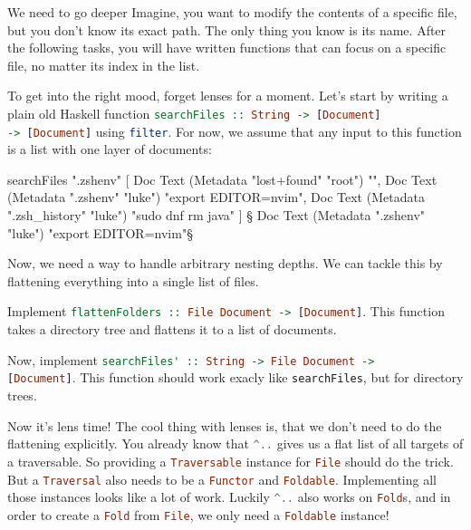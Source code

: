 \documentclass{exercise}
\makeatletter
\def\ergo{\smile@lst@style@comment\raisebox{.1pt}{\scalebox{.8}{\faCaretRight}}}
\newcommand\h[2][]{\lstinline[language=haskell,#1]{#2}}
\def\m#1{\tikzmark{#1}}
\makeatother
\begin{document}
\begin{exercise}{We need to go deeper}
		Imagine, you want to modify the contents of a specific file, but you don't know
		its exact path. The only thing you know is its name. After the following tasks,
		you will have written functions that can focus on a specific file, no matter
		its index in the list.
		\begin{tasks}[resume*]
			\item To get into the right mood, forget lenses for a moment. Let's start by
				writing a plain old Haskell function \h{searchFiles :: String -> [Document]
				-> [Document]} using \h{filter}. For now, we assume that any input to
				this function is a list with one layer of documents:
				\begin{haskell}
searchFiles ".zshenv" [
  Doc Text (Metadata "lost+found" "root") "",
  Doc Text (Metadata ".zshenv" "luke") "export EDITOR=nvim",
  Doc Text (Metadata ".zsh_history" "luke") "sudo dnf rm java"
]
§\ergo{} Doc Text (Metadata ".zshenv" "luke") "export EDITOR=nvim"§
				\end{haskell}
		\end{tasks}
		Now, we need a way to handle arbitrary nesting depths. We can tackle this by
		flattening everything into a single list of files.
		\begin{tasks}[resume*]
			\item \m{op1}Implement \h{flattenFolders :: File Document -> [Document]}. This
				function takes a directory tree and flattens it to a list of documents.
			\item \m{op2}Now, implement \h{searchFiles' :: String -> File Document ->
				[Document]}. This function should work exacly like \h{searchFiles}, but
				for directory trees.
		\end{tasks}
		Now it's lens time! The cool thing with lenses is, that we don't need to do the
		flattening explicitly. You already know that \h{^..} gives us a flat list of all
		targets of a traversable. So providing a \h{Traversable} instance for \h{File}
		should do the trick. But a \h{Traversal} also needs to be a \h{Functor} and
		\h{Foldable}. Implementing all those instances looks like a lot of work. Luckily
		\h{^..} also works on \h{Fold}s, and in order to create a \h{Fold} from
		\h{File}, we only need a \h{Foldable} instance!
		\begin{tasks}[resume*]

\end{tasks}
\end{exercise}
\end{document}
